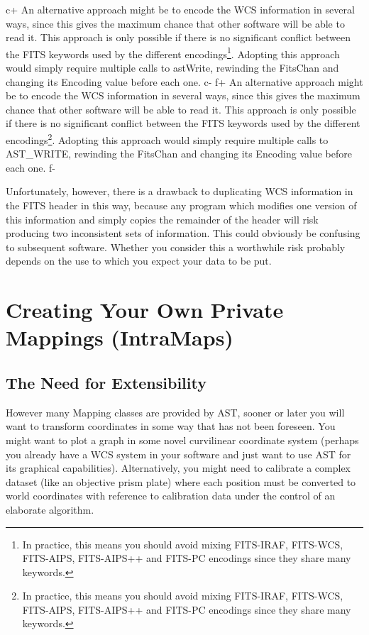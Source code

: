 \documentclass[twoside,11pt]{article}
\begin{document}
c+
An alternative approach might be to encode the WCS information in several
ways, since this gives the maximum chance that other software will be
able to read it. This approach is only possible if there is no
significant conflict between the FITS keywords used by the different
encodings\footnote{In practice, this means you should avoid mixing
FITS-IRAF, FITS-WCS, FITS-AIPS, FITS-AIPS++ and FITS-PC encodings since they share
many keywords.}.  Adopting this approach would simply require multiple
calls to astWrite, rewinding the FitsChan and changing its Encoding value
before each one.
c-
f+
An alternative approach might be to encode the WCS information in several
ways, since this gives the maximum chance that other software will be
able to read it. This approach is only possible if there is no
significant conflict between the FITS keywords used by the different
encodings\footnote{In practice, this means you should avoid mixing
FITS-IRAF, FITS-WCS, FITS-AIPS, FITS-AIPS++ and FITS-PC encodings since they share
many keywords.}.  Adopting this approach would simply require multiple
calls to AST\_WRITE, rewinding the FitsChan and changing its Encoding value
before each one.
f-

Unfortunately, however, there is a drawback to duplicating WCS
information in the FITS header in this way, because any program which
modifies one version of this information and simply copies the
remainder of the header will risk producing two inconsistent sets of
information. This could obviously be confusing to subsequent
software. Whether you consider this a worthwhile risk probably depends
on the use to which you expect your data to be put.

\cleardoublepage
\section{\label{ss:intramaps}Creating Your Own Private Mappings (IntraMaps)}

\subsection{The Need for Extensibility}

However many Mapping classes are provided by AST, sooner or later you
will want to transform coordinates in some way that has not been
foreseen. You might want to plot a graph in some novel curvilinear
coordinate system (perhaps you already have a WCS system in your
software and just want to use AST for its graphical capabilities).
Alternatively, you might need to calibrate a complex dataset (like an
objective prism plate) where each position must be converted to world
coordinates with reference to calibration data under the control of an
elaborate algorithm.
\end{document}
